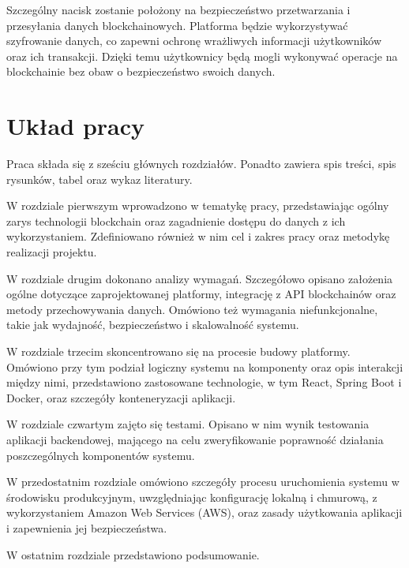 Szczególny nacisk zostanie położony na bezpieczeństwo przetwarzania i przesyłania danych blockchainowych. Platforma będzie wykorzystywać szyfrowanie danych, co zapewni ochronę wrażliwych informacji użytkowników oraz ich transakcji. Dzięki temu użytkownicy będą mogli wykonywać operacje na blockchainie bez obaw o bezpieczeństwo swoich danych.

\section{Układ pracy}
Praca składa się z sześciu głównych rozdziałów. Ponadto zawiera spis treści, spis rysunków, tabel oraz wykaz literatury.

W rozdziale pierwszym wprowadzono w tematykę pracy, przedstawiając ogólny zarys technologii blockchain oraz zagadnienie dostępu do danych z ich wykorzystaniem. Zdefiniowano również w nim cel i zakres pracy oraz metodykę realizacji projektu. 

W rozdziale drugim dokonano analizy wymagań. Szczegółowo opisano założenia ogólne dotyczące zaprojektowanej platformy, integrację z API blockchainów oraz metody przechowywania danych. Omówiono też wymagania niefunkcjonalne, takie jak wydajność, bezpieczeństwo i skalowalność systemu. 

W rozdziale trzecim skoncentrowano się na procesie budowy platformy. Omówiono przy tym podział logiczny systemu na komponenty oraz opis interakcji między nimi, przedstawiono zastosowane technologie, w tym React, Spring Boot i Docker, oraz szczegóły konteneryzacji aplikacji. 

W rozdziale czwartym zajęto się testami. Opisano w nim wynik testowania aplikacji backendowej, mającego na celu zweryfikowanie poprawność działania poszczególnych komponentów systemu. 

W przedostatnim rozdziale omówiono szczegóły procesu uruchomienia systemu w środowisku produkcyjnym, uwzględniając konfigurację lokalną i chmurową, z wykorzystaniem Amazon Web Services (AWS), oraz zasady użytkowania aplikacji i zapewnienia jej bezpieczeństwa. 

W ostatnim rozdziale przedstawiono podsumowanie. 

